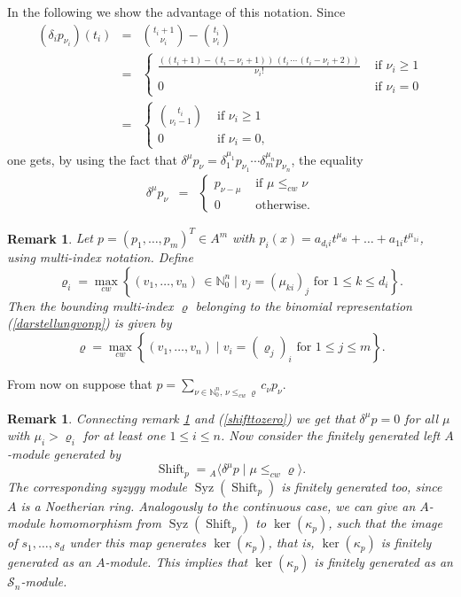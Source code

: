 \documentclass[a4paper,10pt]{article}
\newtheorem{remark}[Th]{Remark}
\theoremstyle{nonumberplain}
\newcommand{\N}{\mathbb{N}}
\DeclareMathOperator{\Shift}{Shift}
\DeclareMathOperator{\Syz}{Syz}
\begin{document}
In the following we show the advantage of this notation. Since 
\begin{eqnarray*}
(\delta_i p_{\nu_i})(t_i) & = & \binom{t_i+1}{ \nu_i } - \binom{ t_i }{ \nu_i }\\
& = & \left\lbrace
\begin{array}{cc}
\frac{((t_i+1)-(t_i-\nu_i+1)) \, (t_i \, \cdots \, (t_i-\nu_i+2))}{\nu_i!} & \mbox{ if } \nu_i \geq 1 \\ 
0 & \mbox{ if } \nu_i =0 \end{array} \right. 
\\
& = & \left\lbrace 
\begin{array}{cc} \binom{ t_i}{  \nu_i-1} & \mbox{ if } \nu_i \geq 1 \\ 0 & \mbox{ if } 
\nu_i =0,  \end{array}  \right. 
\end{eqnarray*}
one gets, by using the fact that $\delta^{\mu}p_{\nu}=\delta_1^{\mu_1}p_{\nu_1} \cdots 
\delta_m^{\mu_n}p_{\nu_n}$, the equality 
\begin{eqnarray}\label{shifttozero} \delta^{\mu}p_{\nu} &=& \left\lbrace 
\begin{array}{cc} p_{\nu - \mu} & \mbox{ if } \mu \leq_{cw} \nu  \\ 
0 & \mbox{ otherwise.} \end{array} \right. \label{zero} \end{eqnarray}


\begin{remark}\label{BoundingIndex}
Let $p=(p_1, \dots, p_m)^T  \in A^m$ with $p_i(x)=a_{d_ii}t^{\mu_{di}} + \dots + a_{1i}t^{\mu_{1i}}$, 
using multi-index notation. Define $$\varrho_i=\max_{cw} \left\lbrace (v_1, \dots, v_n) \, \in 
\N^n_0 \; | \; v_j=(\mu_{ki})_j \mbox{ for } 1\leq k \leq d_i \right\rbrace.$$ Then the bounding 
multi-index $\varrho$ belonging to the binomial representation (\ref{darstellungvonp}) is given by
$$ \varrho=\max_{cw}\left\lbrace (v_1, \dots, v_n) \; | \; v_i=(\varrho_j)_i \mbox{ for } 1 \leq j \leq m \right\rbrace.$$
\end{remark}

From now on suppose that $p = \sum_{\nu \in \N^n_0, \, \nu \leq_{cw} \varrho} c_\nu p_\nu$.

\begin{remark}\label{ShiftVmpumfinitelygenerated}
Connecting remark \ref{BoundingIndex} and (\ref{shifttozero}) we get that $\delta^\mu p = 0$ 
for all $\mu$ with $\mu_i > \varrho_i $ for at least one $1 \leq i \leq n$. Now consider the finitely 
generated left $A$-module generated by
$$ \Shift_p={}_{A}\langle \delta^\mu p \; | \; \mu \leq_{cw} \varrho   \rangle .$$
The corresponding syzygy module $\Syz( \Shift_p)$ is finitely generated too, 
since $A$ is a Noetherian ring. Analogously to the continuous case, 
we can give an 
$A$-module homomorphism from $\Syz( \Shift_p)$ to $\ker(\kappa_p)$, 
such that the image of $s_1, \dots, s_d$ under this map  
generates $\ker(\kappa_p)$, that is, $\ker(\kappa_p)$ is 
finitely generated as an $A$-module. 
This implies that $\ker(\kappa_p)$ is finitely generated as an
$\mathcal{S}_n$-module.
\end{remark}
\end{document}
